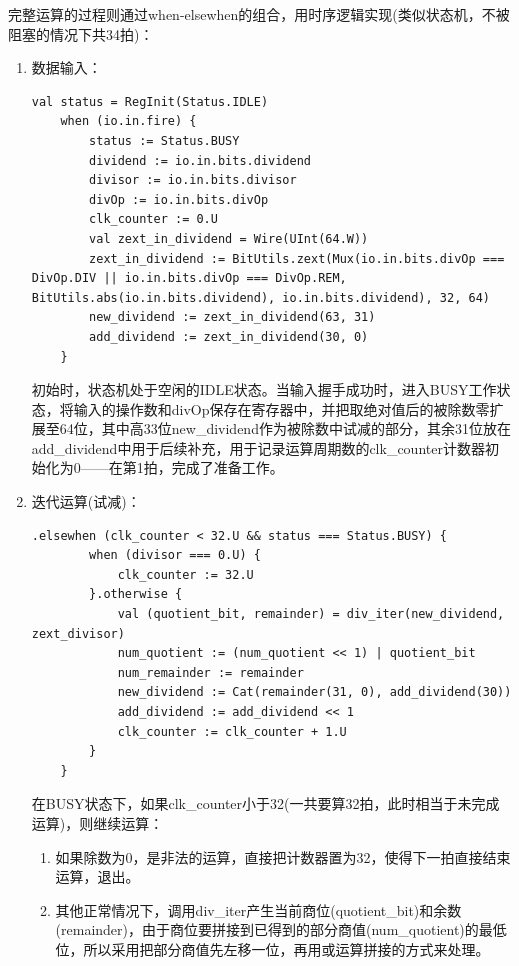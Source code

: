 \documentclass[11pt]{article}
\begin{document}
完整运算的过程则通过when-elsewhen的组合，用时序逻辑实现(类似状态机，不被阻塞的情况下共34拍)：
\begin{enumerate}
    \item 数据输入：
    \begin{lstlisting}[caption={数据输入}]
    val status = RegInit(Status.IDLE)
    when (io.in.fire) {
        status := Status.BUSY
        dividend := io.in.bits.dividend
        divisor := io.in.bits.divisor
        divOp := io.in.bits.divOp
        clk_counter := 0.U
        val zext_in_dividend = Wire(UInt(64.W))
        zext_in_dividend := BitUtils.zext(Mux(io.in.bits.divOp === DivOp.DIV || io.in.bits.divOp === DivOp.REM, BitUtils.abs(io.in.bits.dividend), io.in.bits.dividend), 32, 64)
        new_dividend := zext_in_dividend(63, 31)
        add_dividend := zext_in_dividend(30, 0)
    }
    \end{lstlisting}

    初始时，状态机处于空闲的IDLE状态。当输入握手成功时，进入BUSY工作状态，将输入的操作数和divOp保存在寄存器中，并把取绝对值后的被除数零扩展至64位，其中高33位new_dividend作为被除数中试减的部分，其余31位放在add_dividend中用于后续补充，用于记录运算周期数的clk_counter计数器初始化为0——在第1拍，完成了准备工作。

    \item 迭代运算(试减)：
    \begin{lstlisting}[caption={迭代试减(num_quotient和num_remainder用于保存最终结果)}]
    .elsewhen (clk_counter < 32.U && status === Status.BUSY) {
        when (divisor === 0.U) {
            clk_counter := 32.U
        }.otherwise {
            val (quotient_bit, remainder) = div_iter(new_dividend, zext_divisor)
            num_quotient := (num_quotient << 1) | quotient_bit
            num_remainder := remainder
            new_dividend := Cat(remainder(31, 0), add_dividend(30))
            add_dividend := add_dividend << 1
            clk_counter := clk_counter + 1.U
        }
    }
    \end{lstlisting}
    在BUSY状态下，如果clk_counter小于32(一共要算32拍，此时相当于未完成运算)，则继续运算：
    \begin{enumerate}
        \item 如果除数为0，是非法的运算，直接把计数器置为32，使得下一拍直接结束运算，退出。
        \item 其他正常情况下，调用div_iter产生当前商位(quotient_bit)和余数(remainder)，由于商位要拼接到已得到的部分商值(num_quotient)的最低位，所以采用把部分商值先左移一位，再用或运算拼接的方式来处理。
        

\end{enumerate}
\end{enumerate}
\end{document}
